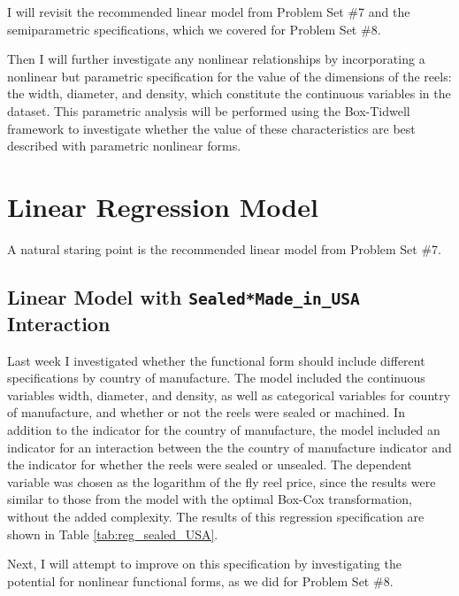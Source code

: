 \documentclass[11pt]{paper}
\begin{document}
I will revisit the recommended linear model
from Problem Set \#7
and the semiparametric specifications, 
which we covered for Problem Set \#8. 



Then I will further investigate any nonlinear relationships
by incorporating a nonlinear but parametric specification
for the value of the dimensions of the reels:
the width, diameter, and density, 
which constitute the continuous variables in the dataset.
This parametric analysis will be performed
using the Box-Tidwell framework
to investigate whether the value of these characteristics
are best described with parametric nonlinear forms. 


\clearpage
\section{Linear Regression Model}

A natural staring point is the recommended linear model
from Problem Set \#7. 

\subsection{Linear Model with \texttt{Sealed*Made\_in\_USA} Interaction}

Last week I investigated whether 
the functional form should include different specifications by
country of manufacture.
% 
The model included the continuous variables 
width, diameter, and density, 
as well as categorical variables for 
country of manufacture, 
and whether or not the reels were sealed or machined. 
% 
In addition to the indicator for the country of manufacture, the model included an indicator for an interaction between
the the country of manufacture indicator and the indicator for whether the reels were sealed or unsealed. 
% 
The dependent variable was chosen as 
the logarithm of the fly reel price, 
since the results were similar to those from the model 
with the optimal Box-Cox transformation, 
without the added complexity. 
% 
The results of this regression specification are shown in 
Table \ref{tab:reg_sealed_USA}. 
% 

% 
Next, I will attempt to improve on this specification
by investigating the potential for nonlinear functional forms, 
as we did for Problem Set \#8. 
\end{document}
